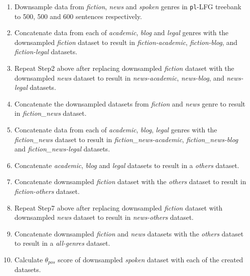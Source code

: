 \begin{enumerate}
    \item Downsample data from \textit{fiction}, \textit{news} and \textit{spoken} genres in \texttt{pl}-LFG treebank to 500, 500 and 600 sentences respectively.
    \item Concatenate data from each of \textit{academic}, \textit{blog} and \textit{legal} genres with the downsampled \textit{fiction} dataset to result in \textit{fiction-academic}, \textit{fiction-blog}, and \textit{fiction-legal} datasets.
    \item Repeat Step2 above after replacing downsampled \textit{fiction} dataset with the downsampled \textit{news} dataset to result in \textit{news-academic}, \textit{news-blog}, and \textit{news-legal} datasets.
    \item Concatenate the downsampled datasets from \textit{fiction} and \textit{news} genre to result in \textit{fiction\_news} dataset.
    \item Concatenate data from each of \textit{academic}, \textit{blog}, \textit{legal} genres with the  \textit{fiction\_news} dataset to result in \textit{fiction\_news-academic}, \textit{fiction\_news-blog} and \textit{fiction\_news-legal} datasets.
    \item Concatenate \textit{academic}, \textit{blog} and \textit{legal} datasets to result in a \textit{others} dataset.
    \item Concatenate downsampled \textit{fiction} dataset with the \textit{others} dataset to result in \textit{fiction-others} dataset.
    \item Repeat Step7 above after replacing downsampled \textit{fiction} dataset with downsampled \textit{news} dataset to result in \textit{news-others} dataset.
    \item Concatenate downsampled \textit{fiction} and \textit{news} datasets with the \textit{others} dataset to result in a \textit{all-genres} dataset.
    \item Calculate $\theta_{pos}$ score of downsampled \textit{spoken} dataset with each of the created datasets.
\end{enumerate}

